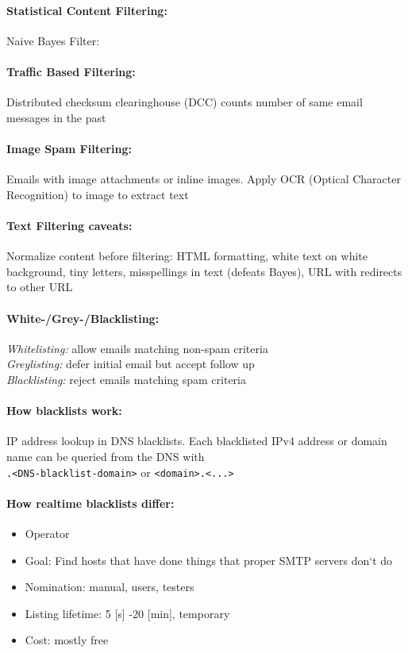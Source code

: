 \paragraph{Statistical Content Filtering:} Naive Bayes Filter:

\paragraph{Traffic Based Filtering:} Distributed checksum clearinghouse (DCC) counts number of same email messages in the past 

\paragraph{Image Spam Filtering:} Emails with image attachments or inline images. Apply OCR (Optical Character Recognition) to image to extract text

\paragraph{Text Filtering caveats:} Normalize content before filtering: HTML formatting, white text on white background, tiny letters, misspellings in text (defeats Bayes), URL with redirects to other URL

\paragraph{White-/Grey-/Blacklisting:} \emph{Whitelisting:} allow emails matching non-spam criteria \\
\textit{Greylisting:} defer initial email but accept follow up \\
\textit{Blacklisting:} reject emails matching spam criteria

\paragraph{How blacklists work:} IP address lookup in DNS blacklists. Each blacklisted IPv4 address or domain name can be queried from the DNS with \\
{\tt <IP-address>.<DNS-blacklist-domain>} or {\tt <domain>.<...>}

\paragraph{How realtime blacklists differ:}
\begin{itemize}
\item Operator
\item Goal: Find hosts that have done things that proper SMTP servers don‘t do
\item Nomination: manual, users, testers 
\item Listing lifetime: 5 [s] -20 [min], temporary 
\item Cost: mostly free
\end{itemize}

